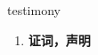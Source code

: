 
\begin{frame}
{\huge testimony}
\begin{center}
\begin{enumerate}\Large
  \item \textbf{证词，声明}
\end{enumerate}
\end{center}
\end{frame}

